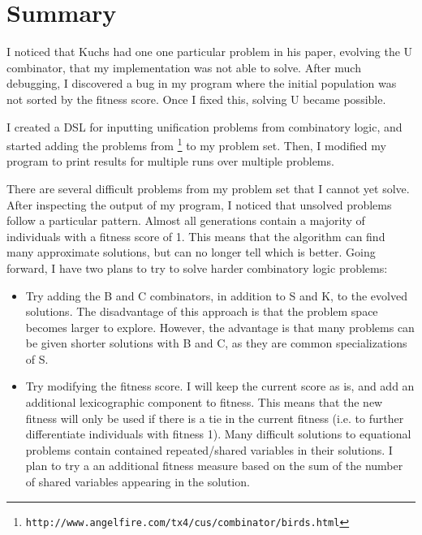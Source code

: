 \documentclass{article}
\begin{document}
\maketitle

\section{Summary}


I noticed that Kuchs had one one particular problem in his paper,
evolving the U combinator, that my implementation was not able to
solve. After much debugging, I discovered a bug in my program where
the initial population was not sorted by the fitness score. Once I
fixed this, solving U became possible.

I created a DSL for inputting unification problems from combinatory
logic, and started adding the problems from
\footnote{\texttt{http://www.angelfire.com/tx4/cus/combinator/birds.html}}
to my problem set. Then, I modified my program to print results for
multiple runs over multiple problems.

There are several difficult problems from my problem set that I cannot
yet solve. After inspecting the output of my program, I noticed that
unsolved problems follow a particular pattern. Almost all generations
contain a majority of individuals with a fitness score of 1. This
means that the algorithm can find many approximate solutions, but can
no longer tell which is better. Going forward, I have two plans to try
to solve harder combinatory logic problems:

\begin{itemize}
\item Try adding the B and C combinators, in addition to S and K, to
  the evolved solutions. The disadvantage of this approach is that the
  problem space becomes larger to explore. However, the advantage is
  that many problems can be given shorter solutions with B and C, as
  they are common specializations of S.

\item Try modifying the fitness score. I will keep the current score
  as is, and add an additional lexicographic component to fitness.
  This means that the new fitness will only be used if there is a tie
  in the current fitness (i.e. to further differentiate individuals
  with fitness 1). Many difficult solutions to equational problems
  contain contained repeated/shared variables in their solutions. I
  plan to try a an additional fitness measure based on the sum of the
  number of shared variables appearing in the solution.
\end{itemize}
\end{document}
